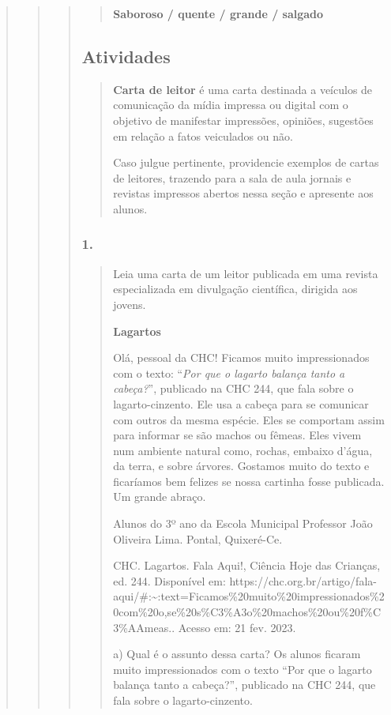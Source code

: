 \begin{quote}
\begin{quote}
\begin{quote}
\begin{quote}
\textbf{Saboroso / quente / grande / salgado}
\end{quote}

\subsection{Atividades}\label{atividades-6}

\begin{quote}
\textbf{Carta de leitor} é uma carta destinada a veículos de comunicação
da mídia impressa ou digital com o objetivo de manifestar impressões,
opiniões, sugestões em relação a fatos veiculados ou não.

Caso julgue pertinente, providencie exemplos de cartas de leitores,
trazendo para a sala de aula jornais e revistas impressos abertos nessa
seção e apresente aos alunos.
\end{quote}

\subsubsection{1. }\label{section-57}

\begin{quote}
Leia uma carta de um leitor publicada em uma revista especializada em
divulgação científica, dirigida aos jovens.

\textbf{Lagartos}

Olá, pessoal da CHC! \protect\hypertarget{_Hlk127887653}{}{}Ficamos
muito impressionados com o texto: ``\emph{Por que o lagarto balança
tanto a cabeça?}'', publicado na CHC 244, que fala sobre o
lagarto-cinzento. Ele usa a cabeça para se comunicar com outros da mesma
espécie. Eles se comportam assim para informar se são machos ou fêmeas.
Eles vivem num ambiente natural como, rochas, embaixo d'água, da terra,
e sobre árvores. Gostamos muito do texto e ficaríamos bem felizes se
nossa cartinha fosse publicada. Um grande abraço.

Alunos do 3º ano da Escola Municipal Professor João Oliveira Lima.
Pontal, Quixeré-Ce.

CHC. Lagartos. Fala Aqui!, Ciência Hoje das Crianças, ed. 244.
Disponível em:
https://chc.org.br/artigo/fala-aqui/\#:\textasciitilde{}:text=Ficamos\%20muito\%20impressionados\%20com\%20o,se\%20s\%C3\%A3o\%20machos\%20ou\%20f\%C3\%AAmeas..
Acesso em: 21 fev. 2023.

a) Qual é o assunto dessa carta? Os alunos ficaram muito impressionados
com o texto ``Por que o lagarto balança tanto a cabeça?'', publicado na
CHC 244, que fala sobre o lagarto-cinzento.


\end{quote}
\end{quote}
\end{quote}
\end{quote}
